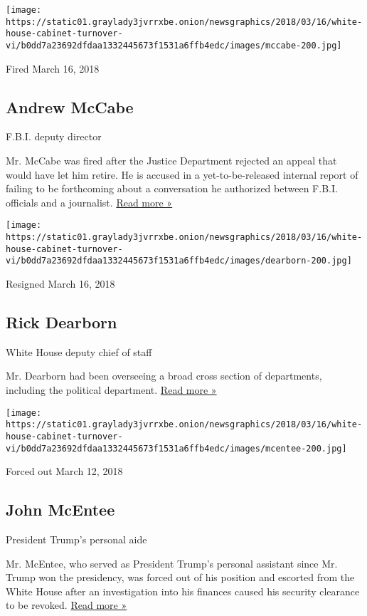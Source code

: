\texttt{[image: https://static01.graylady3jvrrxbe.onion/newsgraphics/2018/03/16/white-house-cabinet-turnover-vi/b0dd7a23692dfdaa1332445673f1531a6ffb4edc/images/mccabe-200.jpg]}

Fired March 16, 2018

\hypertarget{andrew-mccabe}{%
\subsection{Andrew McCabe}\label{andrew-mccabe}}

F.B.I. deputy director

Mr. McCabe was fired after the Justice Department rejected an appeal
that would have let him retire. He is accused in a yet-to-be-released
internal report of failing to be forthcoming about a conversation he
authorized between F.B.I. officials and a journalist.
\href{https://www.nytimes3xbfgragh.onion/2018/03/16/us/politics/andrew-mccabe-fbi-fired.html}{Read
more »}

\texttt{[image: https://static01.graylady3jvrrxbe.onion/newsgraphics/2018/03/16/white-house-cabinet-turnover-vi/b0dd7a23692dfdaa1332445673f1531a6ffb4edc/images/dearborn-200.jpg]}

Resigned March 16, 2018

\hypertarget{rick-dearborn}{%
\subsection{Rick Dearborn}\label{rick-dearborn}}

White House deputy chief of staff

Mr. Dearborn had been overseeing a broad cross section of departments,
including the political department.
\href{https://www.nytimes3xbfgragh.onion/2017/12/21/us/politics/trump-stepien-lewandowki.html}{Read
more »}

\texttt{[image: https://static01.graylady3jvrrxbe.onion/newsgraphics/2018/03/16/white-house-cabinet-turnover-vi/b0dd7a23692dfdaa1332445673f1531a6ffb4edc/images/mcentee-200.jpg]}

Forced out March 12, 2018

\hypertarget{john-mcentee}{%
\subsection{John McEntee}\label{john-mcentee}}

President Trump's personal aide

Mr. McEntee, who served as President Trump's personal assistant since
Mr. Trump won the presidency, was forced out of his position and
escorted from the White House after an investigation into his finances
caused his security clearance to be revoked.
\href{https://www.nytimes3xbfgragh.onion/2018/03/13/us/politics/john-mcentee-trump.html}{Read
more »}

